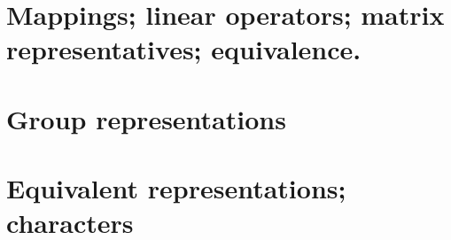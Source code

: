 \documentclass{book}
\begin{document}
\section{}
\section{}
\section{Mappings; linear operators; matrix representatives; equivalence.}
\section{Group representations}
\section{Equivalent representations; characters}
\end{document}
